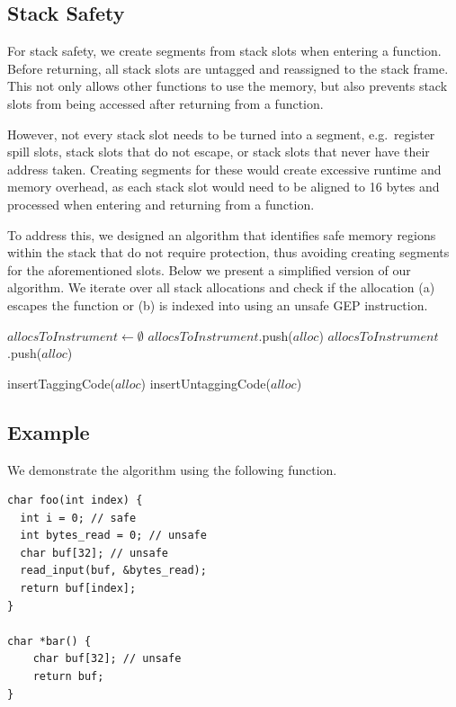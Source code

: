 \subsection{Stack Safety}
\label{subsec:stack-safety}

For stack safety, we create segments from stack slots when entering a function.
Before returning, all stack slots are untagged and reassigned to the stack frame.
This not only allows other functions to use the memory, but also prevents stack slots from being accessed after returning from a function.

However, not every stack slot needs to be turned into a segment, e.g.\ register spill slots, stack slots that do not escape, or stack slots that never have their address taken.
Creating segments for these would create excessive runtime and memory overhead, as each stack slot would need to be aligned to 16 bytes and processed when entering and returning from a function.

To address this, we designed an algorithm that identifies safe memory regions within the stack that do not require protection, thus avoiding creating segments for the aforementioned slots.
Below we present a simplified version of our algorithm.
We iterate over all stack allocations and check if the allocation (a) escapes the function or (b) is indexed into using an unsafe \ac{GEP} instruction.

\begin{algorithmic}
    \State $allocsToInstrument \gets \emptyset$
            \State $allocsToInstrument$.push($alloc$)
        \EndIf
            \State $allocsToInstrument$.push($alloc$)
        \EndIf
    \EndFor

        \State insertTaggingCode($alloc$)
        \State insertUntaggingCode($alloc$)
    \EndFor
\end{algorithmic}

\subsection{Example}
\label{subsec:example2}

We demonstrate the algorithm using the following function.

\begin{lstlisting}[frame=h,style=customc,
    label={lst:stack-safety}]
char foo(int index) {
  int i = 0; // safe
  int bytes_read = 0; // unsafe
  char buf[32]; // unsafe
  read_input(buf, &bytes_read);
  return buf[index];
}

char *bar() {
    char buf[32]; // unsafe
    return buf;
}
\end{lstlisting}

